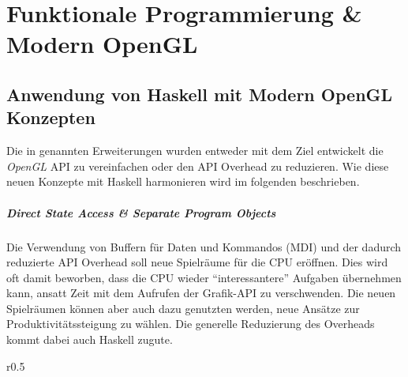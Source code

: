 \chapter{Funktionale Programmierung \& Modern OpenGL}
\label{chap:haskell-modern-gl}

\begingroup
\section{Anwendung von Haskell mit Modern OpenGL Konzepten}\label{sec:haskell-gl-anwendung}

Die in  genannten Erweiterungen wurden entweder mit dem Ziel entwickelt die \textit{OpenGL} \ac{API} zu vereinfachen oder den \ac{API} Overhead zu reduzieren. Wie diese neuen Konzepte mit Haskell harmonieren wird im folgenden beschrieben.

\paragraph{Direct State Access \& Separate Program Objects} Die Verwendung von Buffern für Daten und Kommandos (\ac{MDI}) und der dadurch reduzierte API Overhead soll neue Spielräume für die CPU eröffnen. Dies wird oft damit beworben, dass die CPU wieder "`interessantere"' Aufgaben übernehmen kann, ansatt Zeit mit dem Aufrufen der Grafik-\ac{API} zu verschwenden. Die neuen Spielräumen können aber auch dazu genutzten werden, neue Ansätze zur Produktivitätssteigung zu wählen. Die generelle Reduzierung des Overheads kommt dabei auch Haskell zugute.

\begin{wrapfigure}{r}{0.5\linewidth}
\centering
{}
\end{wrapfigure}

